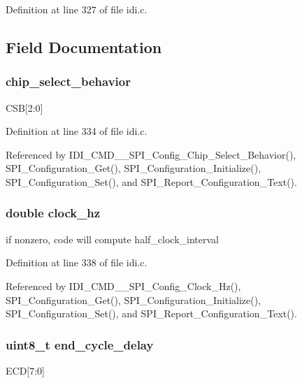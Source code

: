 Definition at line 327 of file idi.\+c.



\subsection{Field Documentation}
\hypertarget{structspi__cfg_aede15f437dcd3a33a5605c71b3bf3801}{
\subsubsection[{chip\+\_\+select\+\_\+behavior}]{ chip\+\_\+select\+\_\+behavior}}\label{structspi__cfg_aede15f437dcd3a33a5605c71b3bf3801}
C\+S\+B\mbox{[}2\+:0\mbox{]} 

Definition at line 334 of file idi.\+c.



Referenced by I\+D\+I\+\_\+\+C\+M\+D\+\_\+\+\_\+\+S\+P\+I\+\_\+\+Config\+\_\+\+Chip\+\_\+\+Select\+\_\+\+Behavior(), S\+P\+I\+\_\+\+Configuration\+\_\+\+Get(), S\+P\+I\+\_\+\+Configuration\+\_\+\+Initialize(), S\+P\+I\+\_\+\+Configuration\+\_\+\+Set(), and S\+P\+I\+\_\+\+Report\+\_\+\+Configuration\+\_\+\+Text().

\hypertarget{structspi__cfg_aaed71f77ad7200a8f4bf0f1cdd0fb328}{
\subsubsection[{clock\+\_\+hz}]{\setlength{\rightskip}{0pt plus 5cm}double clock\+\_\+hz}}\label{structspi__cfg_aaed71f77ad7200a8f4bf0f1cdd0fb328}
if nonzero, code will compute half\+\_\+clock\+\_\+interval 

Definition at line 338 of file idi.\+c.



Referenced by I\+D\+I\+\_\+\+C\+M\+D\+\_\+\+\_\+\+S\+P\+I\+\_\+\+Config\+\_\+\+Clock\+\_\+\+Hz(), S\+P\+I\+\_\+\+Configuration\+\_\+\+Get(), S\+P\+I\+\_\+\+Configuration\+\_\+\+Initialize(), S\+P\+I\+\_\+\+Configuration\+\_\+\+Set(), and S\+P\+I\+\_\+\+Report\+\_\+\+Configuration\+\_\+\+Text().

\hypertarget{structspi__cfg_a0b6f06a341aa4e9fbbbb33b417b5f722}{
\subsubsection[{end\+\_\+cycle\+\_\+delay}]{\setlength{\rightskip}{0pt plus 5cm}uint8\+\_\+t end\+\_\+cycle\+\_\+delay}}\label{structspi__cfg_a0b6f06a341aa4e9fbbbb33b417b5f722}
E\+C\+D\mbox{[}7\+:0\mbox{]} 

